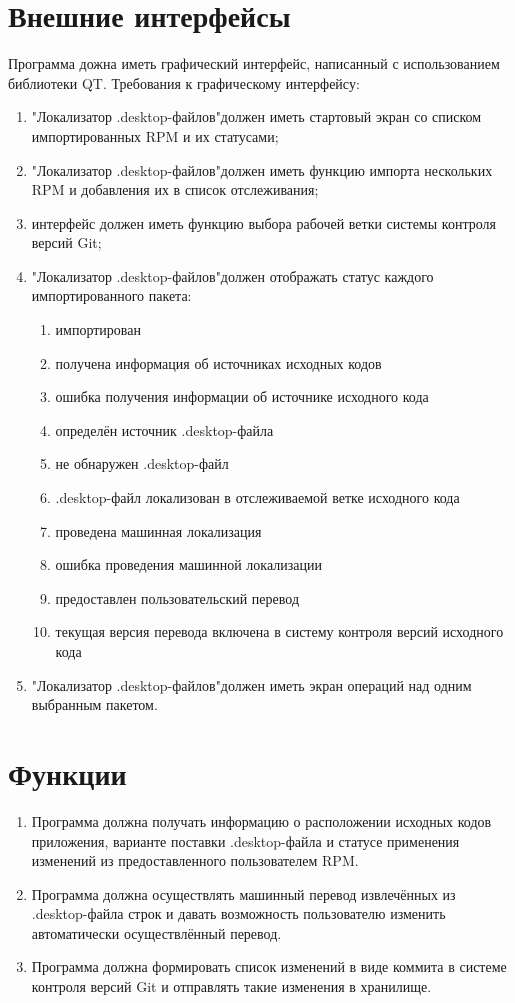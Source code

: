 \documentclass[a4paper,10pt]{report}
\newcommand{\ldf}{"Локализатор .desktop-файлов"}
\newcommand{\df}{.desktop-файл}
\begin{document}
\section{Внешние интерфейсы}
Программа дожна иметь графический интерфейс, написанный с использованием библиотеки QT.
Требования к графическому интерфейсу:
\begin{enumerate}
	\item \ldf должен иметь стартовый экран со списком импортированных RPM и их статусами;
	\item \ldf должен иметь функцию импорта нескольких RPM и добавления их в список отслеживания;
	\item интерфейс должен иметь функцию выбора рабочей ветки системы контроля версий Git;
	\item \ldf должен отображать статус каждого импортированного пакета:
	\begin{enumerate}
		\item импортирован
		\item получена информация об источниках исходных кодов
		\item ошибка получения информации об источнике исходного кода
		\item определён источник {\df}а
		\item не обнаружен \df
		\item {\df} локализован в отслеживаемой ветке исходного кода
		\item проведена машинная локализация
		\item ошибка проведения машинной локализации
		\item предоставлен пользовательский перевод
		\item текущая версия перевода включена в систему контроля версий исходного кода
	\end{enumerate}
	\item \ldf должен иметь экран операций над одним выбранным пакетом.
\end{enumerate}

\section{Функции}
\begin{enumerate}
	\item Программа должна получать информацию о расположении исходных кодов приложения, варианте поставки {\df}а и статусе применения изменений из предоставленного пользователем RPM.
	\item Программа должна осуществлять машинный перевод извлечённых из {\df}а строк и давать возможность пользователю изменить автоматически осуществлённый перевод.
	\item Программа должна формировать список изменений в виде коммита в системе контроля версий Git и отправлять такие изменения в хранилище.	
\end{enumerate}
\end{document}
